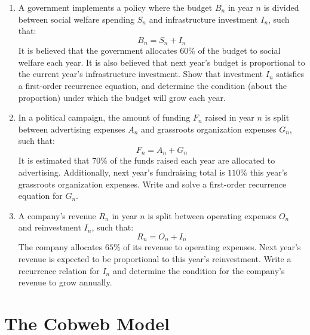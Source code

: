 \documentclass{article}
\begin{document}
\begin{enumerate}[leftmargin = 0.5cm, label = \arabic*., rightmargin = 0.2cm]

    \item A government implements a policy where the budget \( B_n \) in year \(n\) is divided between social welfare spending \(S_n\) and infrastructure investment \(I_n\), such that:
    \[
    B_n = S_n + I_n
    \]
    It is believed that the government allocates $60\%$ of the budget to social welfare each year. It is also believed that next year's budget is proportional to the current year's infrastructure investment. Show that investment \(I_n\) satisfies a first-order recurrence equation, and determine the condition (about the proportion) under which the budget will grow each year.

    \item In a political campaign, the amount of funding \( F_n \) raised in year \(n\) is split between advertising expenses \(A_n\) and grassroots organization expenses \(G_n\), such that:
    \[
    F_n = A_n + G_n
    \]
    It is estimated that $70\%$ of the funds raised each year are allocated to advertising. Additionally, next year's fundraising total is $110\%$ this year's grassroots organization expenses. Write and solve a first-order recurrence equation for \(G_n\).

    \item A company's revenue \(R_n\) in year \(n\) is split between operating expenses \(O_n\) and reinvestment \(I_n\), such that:
    \[
    R_n = O_n + I_n
    \]
    The company allocates $65\%$ of its revenue to operating expenses. Next year's revenue is expected to be proportional to this year's reinvestment. Write a recurrence relation for \(I_n\) and determine the condition for the company’s revenue to grow annually.

\end{enumerate}

\section{The Cobweb Model}
\end{document}
